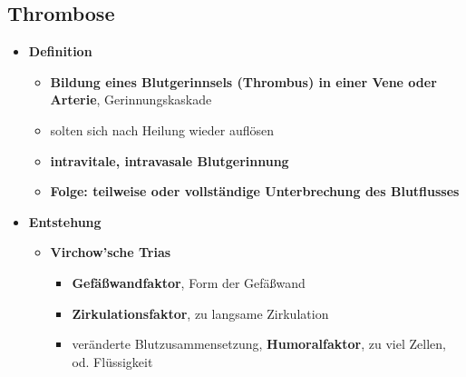 	\subsection{Thrombose}
		\begin{itemize}
			\item \textbf{Definition}
				\begin{itemize}
					\item \textbf{Bildung eines Blutgerinnsels (Thrombus) in einer Vene oder Arterie}, Gerinnungskaskade
					\item solten sich nach Heilung wieder auflösen
					\item \textbf{intravitale, intravasale Blutgerinnung}
					\item \textbf{Folge: teilweise oder vollständige Unterbrechung des Blutflusses}
				\end{itemize}
			\item \textbf{Entstehung}
					\begin{itemize}
						\item \textbf{Virchow'sche Trias}
							\begin{itemize}
								\item \textbf{Gefäßwandfaktor}, Form der Gefäßwand
								\item \textbf{Zirkulationsfaktor}, zu langsame Zirkulation
								\item veränderte Blutzusammensetzung, \textbf{Humoralfaktor}, zu viel Zellen, od. Flüssigkeit
							\end{itemize}
					\end{itemize}
		\end{itemize}
